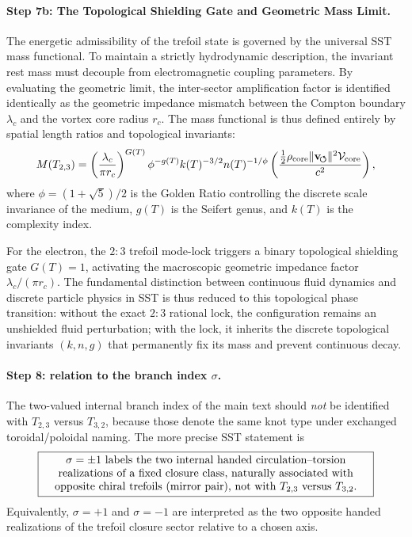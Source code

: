 \documentclass[11pt,a4paper]{article}
\newcommand{\boxedstatement}[1]{\fbox{\parbox{0.86\linewidth}{\centering #1}}}
\begin{document}
\paragraph{Step 7b: The Topological Shielding Gate and Geometric Mass Limit.}
The energetic admissibility of the trefoil state is governed by the universal SST mass functional. To maintain a strictly hydrodynamic description, the invariant rest mass must decouple from electromagnetic coupling parameters. By evaluating the geometric limit, the inter-sector amplification factor is identified identically as the geometric impedance mismatch between the Compton boundary $\lambda_c$ and the vortex core radius $r_c$. The mass functional is thus defined entirely by spatial length ratios and topological invariants:
\begin{equation}
\label{eq:MassFunctional}
M(T_{2,3}) = \left( \frac{\lambda_c}{\pi r_c} \right)^{G(T)} \phi^{-g(T)} k(T)^{-3/2} n(T)^{-1/\phi} \left( \frac{\frac{1}{2}\rho_{\rm core} \lVert\mathbf{v}_{\!\boldsymbol{\circlearrowleft}}\rVert^2 \mathcal{V}_{\rm core}}{c^2} \right),
\end{equation}
where $\phi = (1+\sqrt{5})/2$ is the Golden Ratio controlling the discrete scale invariance of the medium, $g(T)$ is the Seifert genus, and $k(T)$ is the complexity index.

For the electron, the $2{:}3$ trefoil mode-lock triggers a binary topological shielding gate $G(T) = 1$, activating the macroscopic geometric impedance factor $\lambda_c / (\pi r_c)$. The fundamental distinction between continuous fluid dynamics and discrete particle physics in SST is thus reduced to this topological phase transition: without the exact $2{:}3$ rational lock, the configuration remains an unshielded fluid perturbation; with the lock, it inherits the discrete topological invariants $(k, n, g)$ that permanently fix its mass and prevent continuous decay.

\paragraph{Step 8: relation to the branch index \(\sigma\).}
The two-valued internal branch index of the main text should \emph{not} be identified with \(T_{2,3}\) versus \(T_{3,2}\), because those denote the same knot type under exchanged toroidal/poloidal naming. The more precise SST statement is
\begin{equation}
\boxedstatement{$\sigma=\pm 1$ labels the two internal handed circulation--torsion realizations of a fixed closure class, naturally associated with opposite chiral trefoils (mirror pair), not with $T_{2,3}$ versus $T_{3,2}$.}
\label{eq:boxedSigmaTrefoil}
\end{equation}
Equivalently, \(\sigma=+1\) and \(\sigma=-1\) are interpreted as the two opposite handed realizations of the trefoil closure sector relative to a chosen axis.
\end{document}
